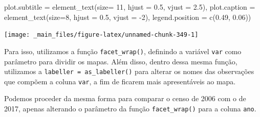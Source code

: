 \documentclass[
  brazilian,
]{book}
\newenvironment{Shaded}{\begin{snugshade}}{\end{snugshade}}
\newcommand{\AttributeTok}[1]{\textcolor[rgb]{0.77,0.63,0.00}{#1}}
\newcommand{\DecValTok}[1]{\textcolor[rgb]{0.00,0.00,0.81}{#1}}
\newcommand{\FloatTok}[1]{\textcolor[rgb]{0.00,0.00,0.81}{#1}}
\newcommand{\FunctionTok}[1]{\textcolor[rgb]{0.00,0.00,0.00}{#1}}
\newcommand{\NormalTok}[1]{#1}
\newcommand{\SpecialCharTok}[1]{\textcolor[rgb]{0.00,0.00,0.00}{#1}}
\begin{document}
\begin{Shaded}
\begin{Highlighting}[]
        \AttributeTok{plot.subtitle =} \FunctionTok{element\_text}\NormalTok{(}\AttributeTok{size=} \DecValTok{11}\NormalTok{, }\AttributeTok{hjust =} \FloatTok{0.5}\NormalTok{, }\AttributeTok{vjust =} \FloatTok{2.5}\NormalTok{),}
        \AttributeTok{plot.caption =} \FunctionTok{element\_text}\NormalTok{(}\AttributeTok{size=}\DecValTok{8}\NormalTok{, }\AttributeTok{hjust =} \FloatTok{0.5}\NormalTok{, }\AttributeTok{vjust =} \SpecialCharTok{{-}}\DecValTok{2}\NormalTok{),}
        \AttributeTok{legend.position =} \FunctionTok{c}\NormalTok{(}\FloatTok{0.49}\NormalTok{, }\FloatTok{0.06}\NormalTok{))}
\end{Highlighting}
\end{Shaded}

\begin{center}\texttt{[image: \_main\_files/figure-latex/unnamed-chunk-349-1]} \end{center}

Para isso, utilizamos a função \texttt{facet\_wrap()}, definindo a variável \texttt{var} como parâmetro para dividir os mapas. Além disso, dentro dessa mesma função, utilizamos a \texttt{labeller\ =\ as\_labeller()} para alterar os nomes das observações que compõem a coluna \texttt{var}, a fim de ficarem mais apresentáveis ao mapa.

Podemos proceder da mesma forma para comparar o censo de 2006 com o de 2017, apenas alterando o parâmetro da função \texttt{facet\_wrap()} para a coluna \texttt{ano}.
\end{document}
